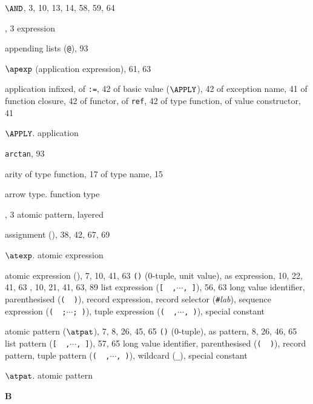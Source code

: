 \begin{theindex}
\item $\AND$, 3, 10, 13, 14, 58, 59, 64
\item \ANDALSO, 3
\subitem\seealso expression
\item appending lists (\verb+@+), 93
\item $\apexp$ (application expression), 61, 63
\item application
\subitem infixed, \infixapplrefs
\subitem of {\tt :=}, 42
\subitem of basic value ($\APPLY$), 42
\subitem of exception name, 41
\subitem of function closure, 42
\subitem of functor, \funcapprefs
\subitem of {\tt ref}, 42
\subitem of type function, \typefunctionrefs
\subitem of value constructor, 41
\item $\APPLY$. \see application
\item {\tt arctan}, 93
\item arity
\subitem of type function, 17
\subitem of type name, 15
\item arrow type. \see function type
\item \AS, 3
\subitem \seealso atomic pattern, layered
\item assignment (\ml{:=}), 38, 42, 67, 69
\item $\atexp$. \see atomic expression
\item atomic expression (\atexp), 7, 10, 41, 63
\subitem \verb+()+ (0-tuple, unit value), \zeroexptuplerefs
\subitem as expression, 10, 22, 41, 63
\subitem {}, 10, 21, 41, 63, 89
\subitem list expression  (\verb+[  ,+$\cdots$\verb+, ]+), 56, 63
\subitem long value identifier, \vidinatexprefs
\subitem parenthesised (\verb+(  )+), \parexprefs
\subitem record expression, \recordexprefs
\subitem record selector (\verb+#+{\it lab}), \hashrefs
\subitem sequence expression  (\verb+(  ;+$\cdots$\verb+; )+), \sequenceexprefs
\subitem tuple expression (\verb+(  ,+$\cdots$\verb+, )+), \tupleexprefs
\subitem \seealso special constant
\item atomic pattern ($\atpat$), 7, 8, 26, 45, 65
\subitem \verb+()+ (0-tuple), \zeropattuplerefs
\subitem as pattern, 8, 26, 46, 65
\subitem list pattern (\verb+[  ,+$\cdots$\verb+, ]+), 57, 65
\subitem long value identifier, \vidinatpatrefs
\subitem parenthesised (\verb+(  )+), \parpatrefs
\subitem record pattern, \recordpatrefs
\subitem tuple pattern (\verb+(  ,+$\cdots$\verb+, )+), \tuplepatrefs
\subitem wildcard (\verb+_+),  \underscorewildrefs
\subitem \seealso special constant
\item $\atpat$. \see atomic pattern
\indexspace
\parbox{65mm}{\hfil{\large\bf B}\hfil}

\end{theindex}
